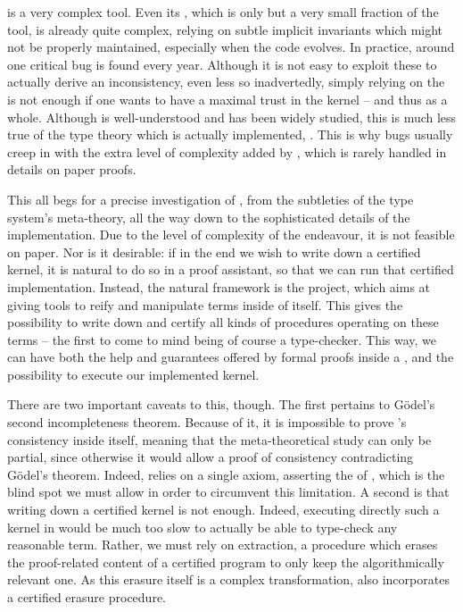  is a very complex tool. Even its , which is only but a very small
fraction of the tool, is already quite complex, relying on subtle implicit invariants which
might not be properly maintained, especially when the code evolves.
In practice, around one critical bug is found every year.%
Although it is not easy to exploit these to actually derive an inconsistency, even less
so inadvertedly, simply relying on the  is not enough if
one wants to have a maximal trust in the kernel – and thus  as a whole.
Although  is well-understood and has been widely studied,
this is much less true of the type theory which is actually implemented, .
This is why bugs usually creep in with the extra level of complexity added by ,
which is rarely handled in details on paper proofs.%

This all begs for a precise investigation of , from the subtleties of the
type system’s meta-theory, all the way down to the sophisticated details of the implementation.
Due to the level of complexity of the endeavour, it is not feasible on paper. Nor is it
desirable: if in the end we wish to write down a certified kernel, it is natural to do so
in a proof assistant, so that we can run that certified implementation.
Instead, the natural framework is the  project,
which aims at giving tools to reify and manipulate  terms%
inside of  itself. This gives the possibility to write down and certify
all kinds of procedures operating on these terms – the first to come to mind being of course
a type-checker. This way, we can have both the help and guarantees offered by
formal proofs inside a , and the possibility to execute
our implemented kernel.

There are two important caveats to this, though.
The first pertains to Gödel’s second incompleteness
theorem. Because of it, it is impossible to prove ’s consistency inside  itself,
meaning that the meta-theoretical study can only be partial, since otherwise it would allow
a proof of consistency contradicting Gödel’s theorem. Indeed,  relies on a single
axiom, asserting the  of ,
which is the blind spot we must allow in order to circumvent this limitation.
A second is that writing down a certified kernel is not enough. Indeed, executing directly
such a kernel in  would be much too slow to actually be able to type-check
any reasonable term. Rather, we must rely on extraction, a procedure which erases the
proof-related content of a certified program to only keep the algorithmically relevant one.
As this erasure itself is a complex transformation,  also incorporates a certified
erasure procedure.

